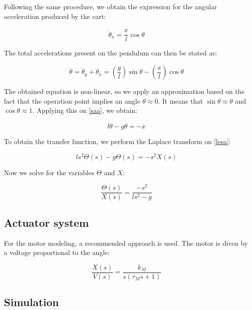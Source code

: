 Following the same procedure, we obtain the expression for the angular acceleration produced by the cart:

\begin{equation} \label{aac}
	\ddot{\theta}_x=\frac{\ddot{x}}{l}\cos{\theta}
\end{equation}

The total accelerations present on the pendulum can then be stated as:

\begin{equation} \label{saa}
	\ddot{\theta}=\ddot{\theta}_g+\ddot{\theta}_x=\left(\frac{g}{l}\right)\sin{\theta}-\left(\frac{\ddot{x}}{l}\right)\cos{\theta}
\end{equation}

The obtained equation is non-linear, so we apply an approximation based on the fact that the operation point implies an angle $\theta\approx0$. It means that $\sin{\theta}\approx\theta$ and $\cos{\theta}\approx1$. Applying this on \ref{saa}, we obtain:

\begin{equation} \label{lesa}
	l\ddot{\theta}-g\theta=-\ddot{x}
\end{equation}

To obtain the transfer function, we perform the Laplace transform on \ref{lesa}:

\begin{equation} \label{ltsa}
	ls^2\Theta(s)-g\Theta(s)=-s^2X(s)
\end{equation}

Now we solve for the variables $\Theta$ and $X$:

\begin{equation} \label{tfsa}
	\frac{\Theta(s)}{X(s)}=\frac{-s^2}{ls^2-g}
\end{equation}

\subsection{Actuator system}

For the motor modeling, a recommended approach \cite{LUN02} is used. The motor is diven by a voltage proportional to the angle:

\begin{equation} \label{mtf2}
	\frac{X(s)}{V(s)}=\frac{k_M}{s(\tau_M s+1)}
\end{equation}



\subsection{Simulation}

